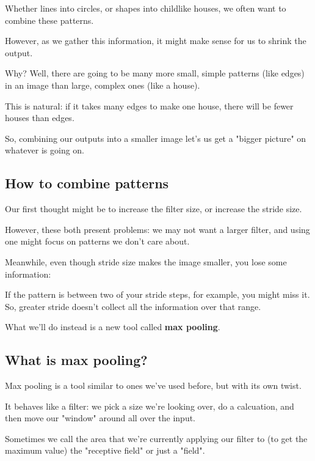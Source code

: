         Whether lines into circles, or shapes into childlike houses, we often want to combine these patterns.
        
        However, as we gather this information, it might make sense for us to shrink the output.
        
        Why? Well, there are going to be many more small, simple patterns (like edges) in an image than large, complex ones (like a house).
        
        This is natural: if it takes many edges to make one house, there will be fewer houses than edges.
        
        So, combining our outputs into a smaller image let's us get a "bigger picture" on whatever is going on.
        
    \subsection{How to combine patterns}
    
        Our first thought might be to increase the filter size, or increase the stride size.
        
        However, these both present problems: we may not want a larger filter, and using one might focus on patterns we don't care about.
        
        Meanwhile, even though stride size makes the image smaller, you lose some information:
        
        If the pattern is between two of your stride steps, for example, you might miss it. So, greater stride doesn't collect all the information over that range.
        
        What we'll do instead is a new tool called \textbf{max pooling}.
    
    \subsection{What is max pooling?}
    
        Max pooling is a tool similar to ones we've used before, but with its own twist.
        
        It behaves like a filter: we pick a size we're looking over, do a calcuation, and then move our "window" around all over the input.
        
        Sometimes we call the area that we're currently applying our filter to (to get the maximum value) the "receptive field" or just a "field".
        
